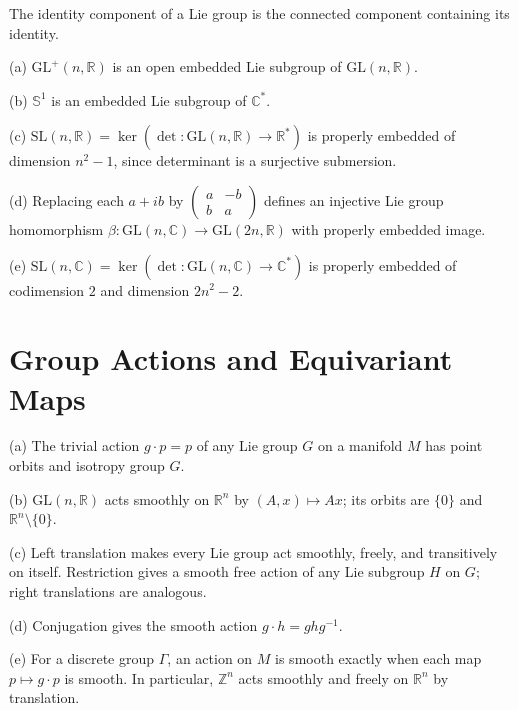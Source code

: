 \begin{definition}
\label{def:7-49-extra-3}
\leanok
The identity component of a Lie group is the connected component containing its identity.
\end{definition}

\begin{example}
\label{ex:7-18}
\leanok
{}
(a) $\mathrm{GL}^{+}(n,\mathbb R)$ is an open embedded Lie subgroup of
$\mathrm{GL}(n,\mathbb R)$.

(b) $\mathbb S^1$ is an embedded Lie subgroup of $\mathbb C^*$.

(c) $\mathrm{SL}(n,\mathbb R)
=\ker(\det:\mathrm{GL}(n,\mathbb R)\to\mathbb R^*)$ is properly embedded of
dimension $n^2-1$, since determinant is a surjective submersion.

(d) Replacing each $a+ib$ by
$\left(\begin{smallmatrix}a&-b\\b&a\end{smallmatrix}\right)$ defines an
injective Lie group homomorphism
$\beta:\mathrm{GL}(n,\mathbb C)\to\mathrm{GL}(2n,\mathbb R)$ with properly
embedded image.

(e) $\mathrm{SL}(n,\mathbb C)
=\ker(\det:\mathrm{GL}(n,\mathbb C)\to\mathbb C^*)$ is properly embedded of
codimension $2$ and dimension $2n^2-2$.
\end{example}

\section{Group Actions and Equivariant Maps}

\begin{example}
\label{ex:7-22}
\leanok
{}
(a) The trivial action $g\cdot p=p$ of any Lie group $G$ on a manifold $M$ has point orbits and isotropy group $G$.

(b) $\mathrm{GL}(n,\mathbb R)$ acts smoothly on $\mathbb R^n$ by $(A,x)\mapsto Ax$; its orbits are $\{0\}$ and $\mathbb R^n\setminus\{0\}$.

(c) Left translation makes every Lie group act smoothly, freely, and transitively on itself. Restriction gives a smooth free action of any Lie subgroup $H$ on $G$; right translations are analogous.

(d) Conjugation gives the smooth action $g\cdot h=ghg^{-1}$.

(e) For a discrete group $\Gamma$, an action on $M$ is smooth exactly when each map $p\mapsto g\cdot p$ is smooth. In particular, $\mathbb Z^n$ acts smoothly and freely on $\mathbb R^n$ by translation.
\end{example}

